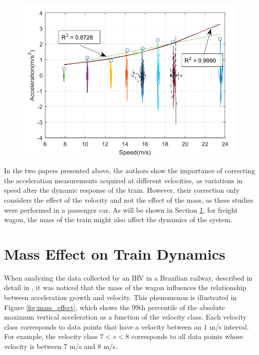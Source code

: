 \begin{figure}[H]
    \centering
    \includegraphics[width=12cm]{Cap2_LitReview/Vel_effect/results_bia.png}
    \caption{\cite{Balouchi02092021}}
    \label{fig:vel_effect_balouchi}
\end{figure}

In the two papers presented above, the authors show the importance of correcting the acceleration measurements acquired at different velocities, as variations in speed alter the dynamic response of the train. However, their correction only considers the effect of the velocity and not the effect of the mass, as these studies were performed in a passenger car. As will be shown in Section \ref{sec-mass-effect-measurement}, for freight wagon, the mass of the train might also affect the dynamics of the system.

\section{Mass Effect on Train Dynamics} \label{sec-mass-effect-measurement}

When analyzing the data collected by an IRV in a Brazilian railway, described in detail in \cite{PIRES2024107191}, it was noticed that the mass of the wagon influences the relationship between acceleration growth and velocity. This phenomenon is illustrated in Figure \ref{fig:mass_effect}, which shows the 99th percentile of the absolute maximum vertical acceleration as a function of the velocity class. Each velocity class corresponds to data points that have a velocity between an 1 m/s interval. For example, the velocity class $7 < v < 8$ corresponds to all data points whose velocity is between 7 m/s and 8 m/s.

